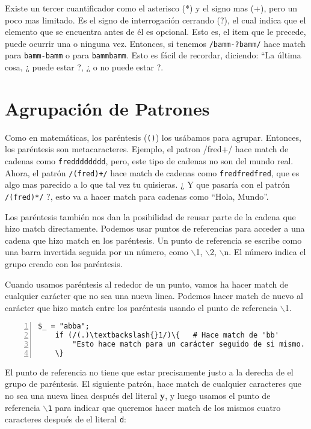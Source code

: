Existe un tercer cuantif\mbox{}icador como el asterisco (*) y el signo mas (+), pero un poco mas limitado. Es el signo de interrogación cerrando (?), el cual indica que el elemento que se encuentra antes de él es opcional. Esto es, el item que le precede, puede ocurrir una o ninguna vez. Entonces, si tenemos \texttt{/bamm-?bamm/} hace match para \texttt{bamm-bamm} o para \texttt{bammbamm}. Esto es fácil de recordar, diciendo: ``La última cosa, ¿ puede estar ?, ¿ o no puede estar ?.

\section{Agrupación de Patrones}

\label{Agrupaci--n-de-Patrones}

Como en matemáticas, los paréntesis (\texttt{()}) los usábamos para agrupar. Entonces, los paréntesis son metacaracteres. Ejemplo, el patron /fred+/ hace match de cadenas como \texttt{fredddddddd}, pero, este tipo de cadenas no son del mundo real. Ahora, el patrón \texttt{/(fred)+/} hace match de cadenas como \texttt{fredfredfred}, que es algo mas parecido a lo que tal vez tu quisieras. ¿ Y que pasaría con el patrón \texttt{/(fred)*/} ?, esto va a hacer match para cadenas como ``Hola, Mundo''.

Los paréntesis también nos dan la posibilidad de reusar parte de la cadena que hizo match directamente. Podemos usar puntos de referencias para acceder a una cadena que hizo match en los paréntesis. Un punto de referencia se escribe como una barra invertida seguida por un número, como $\backslash$1, $\backslash$2, $\backslash$n. El número indica el grupo creado con los paréntesis.

Cuando usamos paréntesis al rededor de un punto, vamos ha hacer match de cualquier carácter que no sea una nueva linea. Podemos hacer match de nuevo al carácter que hizo match entre los paréntesis usando el punto de referencia $\backslash$1.

\vspace{-6pt}
\small
\begin{Verbatim}[commandchars=\\\{\},numbers=left]
    $_ = "abba";
    if (/(.)\textbackslash{}1/)\{   # Hace match de 'bb'
        "Esto hace match para un carácter seguido de si mismo. \textbackslash{}n";
    \}
\end{Verbatim}
\vspace{-6pt}
\normalsize
El punto de referencia no tiene que estar precisamente justo a la derecha de el grupo de paréntesis. El siguiente patrón, hace match de cualquier caracteres que no sea una nueva linea después del literal \textbf{y}, y luego usamos el punto de referencia \texttt{$\backslash$1} para indicar que queremos hacer match de los mismos cuatro caracteres después de el literal \texttt{d}:

